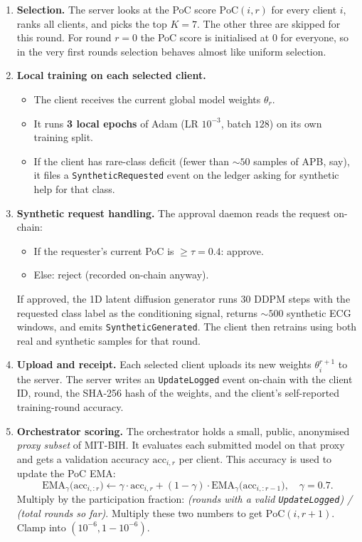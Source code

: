 \documentclass[11pt,a4paper]{article}
\begin{document}
\begin{enumerate}
\item \textbf{Selection.}
The server looks at the PoC score $\mathrm{PoC}(i, r)$ for every
client $i$, ranks all clients, and picks the top $K=7$. The other
three are skipped for this round. For round $r=0$ the PoC score is
initialised at $0$ for everyone, so in the very first rounds
selection behaves almost like uniform selection.

\item \textbf{Local training on each selected client.}
\begin{itemize}
\item The client receives the current global model weights $\theta_r$.
\item It runs \textbf{3 local epochs} of Adam (LR $10^{-3}$, batch $128$) on its own training split.
\item If the client has rare-class deficit (fewer than $\sim 50$ samples of APB, say), it files a \texttt{SyntheticRequested} event on the ledger asking for synthetic help for that class.
\end{itemize}

\item \textbf{Synthetic request handling.}
The approval daemon reads the request on-chain:
\begin{itemize}
\item If the requester's current PoC is $\ge \tau = 0.4$: approve.
\item Else: reject (recorded on-chain anyway).
\end{itemize}
If approved, the 1D latent diffusion generator runs 30 DDPM steps with the requested class label as the conditioning signal, returns $\sim 500$ synthetic ECG windows, and emits \texttt{SyntheticGenerated}. The client then retrains using both real and synthetic samples for that round.

\item \textbf{Upload and receipt.}
Each selected client uploads its new weights $\theta_i^{r+1}$ to the server. The server writes an \texttt{UpdateLogged} event on-chain with the client ID, round, the SHA-256 hash of the weights, and the client's self-reported training-round accuracy.

\item \textbf{Orchestrator scoring.}
The orchestrator holds a small, public, anonymised \emph{proxy subset} of MIT-BIH. It evaluates each submitted model on that proxy and gets a validation accuracy $\mathrm{acc}_{i,r}$ per client. This accuracy is used to update the PoC EMA:
\[
\mathrm{EMA}_{\gamma}\big(\mathrm{acc}_{i,:r}\big) \gets \gamma \cdot \mathrm{acc}_{i,r} + (1-\gamma) \cdot \mathrm{EMA}_{\gamma}\big(\mathrm{acc}_{i,:r-1}\big),\quad \gamma=0.7.
\]
Multiply by the participation fraction: \emph{(rounds with a valid \texttt{UpdateLogged}) / (total rounds so far)}. Multiply these two numbers to get $\mathrm{PoC}(i, r+1)$. Clamp into $(10^{-6}, 1-10^{-6})$.


\end{enumerate}
\end{document}
